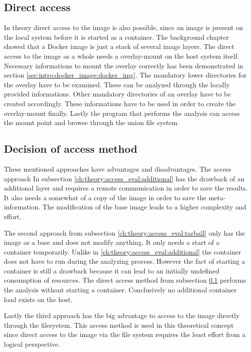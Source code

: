 \subsection{Direct access} 
\label{ch:theory:access_eval:direct_access}
In theory direct access to the image is also possible, since an image is present on the local system before it is started as a container.
The background chapter showed that a Docker image is just a stack of several image layers. 
The direct access to the image as a whole needs a overlay-mount on the host system itself.
Necessary informations to mount the overlay correctly has been demonstrated in section \ref{sec:intro:docker_image:docker_img}.
The mandatory lower directories for the overlay have to be examined. 
These can be analyzed through the locally provided informations.
Other mandatory directories of an overlay have to be created accordingly.
These informations have to be used in order to create the overlay-mount finally. 
Lastly the program that performs the analysis can access the mount point and browse through the union file system.

\subsection{Decision of access method} 
\label{ch:theory:access_eval:decision_access}
These mentioned approaches have advantages and disadvantages. 	
The access approach In subsection \ref{ch:theory:access_eval:additional} has the drawback of an additional layer and requires a remote communication in order to save the results.
It also needs a somewhat of a copy of the image in order to save the meta-information. 
The modification of the base image leads to a higher complexity and effort. 

The second approach from subsection \ref{ch:theory:access_eval:tarball} only has the image as a base and does not modify anything. 
It only needs a start of a container temporarily. 
Unlike in \ref{ch:theory:access_eval:additional} the container does not have to run during the analyzing process. 
However the fact of starting a container is still a drawback because it can lead to an initially undefined consumption of resources.
The direct access method from subsection \ref{ch:theory:access_eval:direct_access} performs the analysis without starting a container. 
Conclusively no additional container load exists on the host.

Lastly the third approach has the big advantage to access to the image directly through the filesystem. 
This access method is used in this theoretical concept since direct access to the image via the file system requires the least effort from a logical perspective.